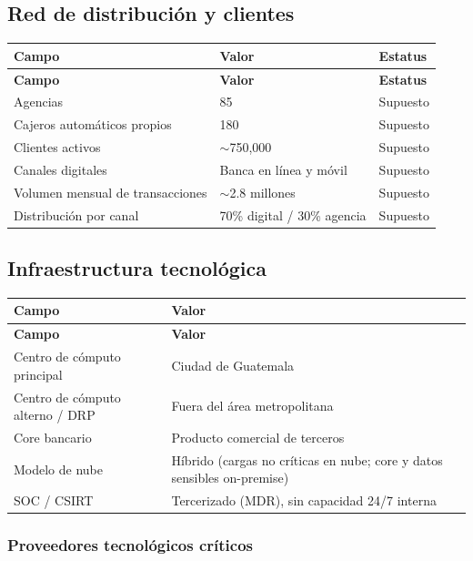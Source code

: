 \documentclass[11pt,a4paper]{article}
\begin{document}
	\subsection{Red de distribución y clientes}
	
	\begin{longtable}{@{}p{6cm}p{5cm}p{3cm}@{}}
		\toprule
		\textbf{Campo} & \textbf{Valor} & \textbf{Estatus} \\ \midrule
		\endfirsthead
		\toprule
		\textbf{Campo} & \textbf{Valor} & \textbf{Estatus} \\ \midrule
		\endhead
		Agencias & 85 & Supuesto \\
		Cajeros automáticos propios & 180 & Supuesto \\
		Clientes activos & $\sim$750,000 & Supuesto \\
		Canales digitales & Banca en línea y móvil & Supuesto \\
		Volumen mensual de transacciones & $\sim$2.8 millones & Supuesto \\
		Distribución por canal & 70\% digital / 30\% agencia & Supuesto \\ \bottomrule
	\end{longtable}
	
	\subsection{Infraestructura tecnológica}
	
	\begin{longtable}{@{}p{5cm}p{8.5cm}@{}}
		\toprule
		\textbf{Campo} & \textbf{Valor} \\ \midrule
		\endfirsthead
		\toprule
		\textbf{Campo} & \textbf{Valor} \\ \midrule
		\endhead
		Centro de cómputo principal & Ciudad de Guatemala \\
		Centro de cómputo alterno / DRP & Fuera del área metropolitana \\
		Core bancario & Producto comercial de terceros \\
		Modelo de nube & Híbrido (cargas no críticas en nube; core y datos sensibles on-premise) \\
		SOC / CSIRT & Tercerizado (MDR), sin capacidad 24/7 interna \\ \bottomrule
	\end{longtable}
	
	\subsubsection*{Proveedores tecnológicos críticos}
	
\end{document}
